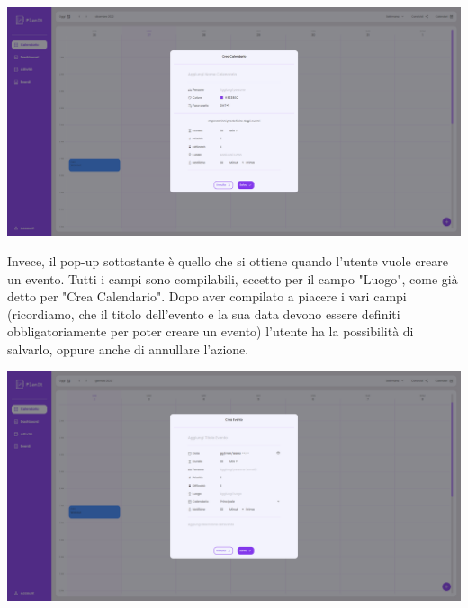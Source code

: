 \begin{center}
    \includegraphics[width=1\textwidth, height=0.3\textheight]{img/png/FrontEnd/Calendario/calendario_creaCalendario.png}
\end{center}

Invece, il pop-up sottostante è quello che si ottiene quando l'utente vuole creare un evento. Tutti i campi sono compilabili, eccetto per il campo "Luogo", come già detto per "Crea Calendario". Dopo aver compilato a piacere i vari campi (ricordiamo, che il titolo dell'evento e la sua data devono essere definiti obbligatoriamente per poter creare un evento) l'utente ha la possibilità di salvarlo, oppure anche di annullare l'azione.

\begin{center}
    \includegraphics[width=1\textwidth, height=0.3\textheight]{img/png/FrontEnd/Calendario/calendario_creaEvento.png}
\end{center}

